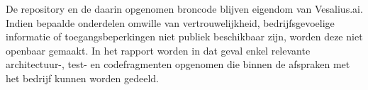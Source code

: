 \documentclass[dutch,dit,report]{hogentreport}
\begin{document}
De repository en de daarin opgenomen broncode blijven eigendom van Vesalius.ai.
Indien bepaalde onderdelen omwille van vertrouwelijkheid, bedrijfsgevoelige
informatie of toegangsbeperkingen niet publiek beschikbaar zijn, worden deze
niet openbaar gemaakt. In het rapport worden in dat geval enkel relevante
architectuur-, test- en codefragmenten opgenomen die binnen de afspraken met
het bedrijf kunnen worden gedeeld.









\backmatter{}

\setlength\bibitemsep{2pt}

\printbibliography[heading=bibintoc]
\end{document}
